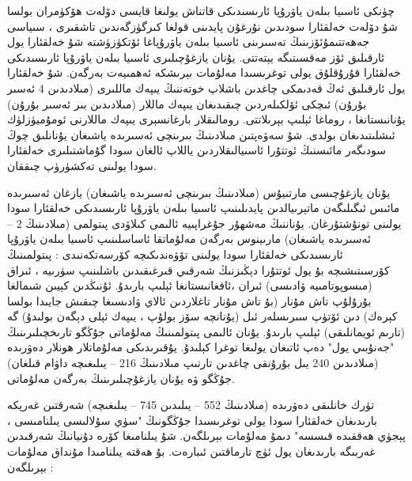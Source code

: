 \documentclass[a4paper]{article}
\begin{document}
چۈنكى ئاسىيا بىلەن ياۋرۇپا ئارىسىدىكى قاتناش يولىغا قايسى دۆلەت ھۆكۈمران بولسا شۇ دۆلەت خەلقئارا سودىدىن نۇرغۇن پايدىنى قولغا كىرگۈزگەندىن تاشقىرى ، سىياسى جەھەتتىمۇئۆزىنىڭ تەسىرىنى ئاسىيا بىلەن ياۋرۇپاغا ئۆتكۈزۈشتە شۇ خەلقئارا يول ئارقىلىق ئۆز مەقسىتىگە يېتەتتى. يۇنان يازغۇچىلىرى ئاسىيا بىلەن ياۋرۇپا ئارىسىدىكى خەلقئارا قۇرۇقلۇق يولى توغرىسىدا مەلۇمات بېرىشكە ئەھمىيەت بەرگەن. شۇ خەلقئارا يول ئارقىلىق ئەڭ قەدىمكى چاغدىن باشلاپ خوتەننىڭ يىپەك ماللىرى (مىلادىدىن 4 ئەسىر بۇرۇن) ئىچكى ئۆلكىلەردىن چىقىدىغان يىپەك ماللار (مىلادىدىن بىر ئەسىر بۇرۇن) يۇنانىستانغا ، روماغا ئېلىپ بېرىلاتتى. رومالىقلار بارغانسېرى يىپەك ماللارنى ئومۇميۈزلۈك ئىشلىتىدىغان بولدى. شۇ سەۋەپتىن مىلادىنىڭ بىرىنچى ئەسىرىدە ياشىغان يۇنانلىق چوڭ سودىگەر مائىسنىڭ ئوتتۇرا ئاسىيالىقلاردىن ياللاپ ئالغان سودا گۇماشتىلىرى خەلفئارا سودا يولىنى تەكشۈرۈپ چىققان.



يۇنان يازغۇچىسى مارتىيۇس (مىلادىنىڭ بىرىنچى ئەسىرىدە ياشىغان) يازغان ئەسىرىدە مائىس ئىگىلىگەن ماتېرىيالدىن پايدىلىنىپ ئاسىيا بىلەن ياۋرۇپا ئارىسىدىكى خەلقئارا سودا يولىنى تونۇشتۇرغان. يۇناننىڭ مەشھۇر جۇغراپىيە ئالىمى كىلاۋدى پىتولمى (مىلادىنىڭ 2 – ئەسىرىدە ياشىغان) مارىينوس بەرگەن مەلۇماتقا ئاساسلىنىپ ئاسىيا بىلەن ياۋرۇپا ئارىسىدىكى خەلقئارا سودا يولىنى تۆۋەندىكىچە كۆرسەتكەنىدى : پىتولمىنىڭ كۆرسىتىشىچە بۇ يول ئوتتۇرا دېڭىزنىڭ شەرقىي قىرغىقىدىن باشلىنىپ سۈرىيە ، ئىراق (مىسوپوتامىيە ۋادىسى) ئىران ،ئافغانىستانغا ئېلىپ بارىدۇ. ئۇنىڭدىن كېيىن شىمالغا بۇرۇلۇپ تاش مۇنار (بۇ تاش مۇنار تاغلاردىن ئالاي ۋادىسىغا چىقىش جايىدا بولسا كېرەك) دىن ئۆتۈپ سىرىسلەر ئىل (يۇنانچە سۆز بولۇپ ، يىپەك ئېلى دېگەن بولىدۇ) گە (تارىم ئويمانلىقى) ئېلىپ بارىدۇ. يۇنان ئالىمى پىتولمىنىڭ مەلۇماتى جۇڭگو تارىخچىلىرىنىڭ "جەنۇبىي يول" دەپ ئاتىغان يولىغا توغرا كېلىدۇ. يۇقىرىدىكى مەلۇماتلار ھونلار دەۋرىدە (مىلادىدىن 240 يىل بۇرۇنقى چاغدىن تارتىپ مىلادىنىڭ 216 – يىلىغىچە داۋام قىلغان) جۇڭگو ۋە يۇنان يازغۇچىلىرىنىڭ بەرگەن مەلۇماتى.



تۈرك خانلىقى دەۋرىدە (مىلادىنىڭ 552 – يىلىدىن 745 – يىلىغىچە) شەرقتىن غەرپكە بارىدىغان خەلقئارا سودا يولى توغرىسىدا جۇڭگونىڭ "سۈي سۇلالىسى يىلنامىسى ، پېجۈي ھەققىدە قىسسە" دىمۇ مەلۇمات بېرىلگەن. شۇ يىلنامىغا كۆرە دۇنيانىڭ شەرقىدىن غەربىگە بارىدىغان يول ئۈچ تارماقتىن ئىبارەت. بۇ ھەقتە يىلنامىدا مۇنداق مەلۇمات بېرىلگەن :
\end{document}
